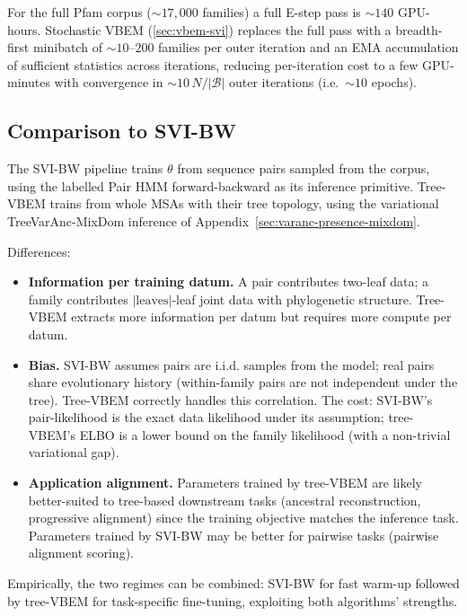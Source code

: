 For the full Pfam corpus ($\sim 17{,}000$ families) a full E-step pass
is $\sim 140$ GPU-hours. Stochastic VBEM
(\cref{sec:vbem-svi}) replaces the full pass with a breadth-first
minibatch of $\sim 10$--$200$ families per outer iteration and an EMA
accumulation of sufficient statistics across iterations,
reducing per-iteration cost to a few GPU-minutes with convergence in
$\sim 10\,N/|\mathcal{B}|$ outer iterations (i.e.\ $\sim 10$ epochs).

\subsection{Comparison to SVI-BW}
\label{sec:vbem-vs-svibw}

The SVI-BW pipeline trains $\theta$ from sequence pairs sampled from
the corpus, using the labelled Pair HMM forward-backward as its
inference primitive. Tree-VBEM trains from whole MSAs with their tree
topology, using the variational TreeVarAnc-MixDom inference of
Appendix~\ref{sec:varanc-presence-mixdom}.

Differences:
\begin{itemize}[nosep]
\item \textbf{Information per training datum.} A pair contributes
two-leaf data; a family contributes $|\text{leaves}|$-leaf joint data
with phylogenetic structure. Tree-VBEM extracts more information per
datum but requires more compute per datum.
\item \textbf{Bias.} SVI-BW assumes pairs are i.i.d. samples from the
model; real pairs share evolutionary history (within-family pairs are
not independent under the tree). Tree-VBEM correctly handles this
correlation. The cost: SVI-BW's pair-likelihood is the exact data
likelihood under its assumption; tree-VBEM's ELBO is a lower bound on
the family likelihood (with a non-trivial variational gap).
\item \textbf{Application alignment.} Parameters trained by tree-VBEM
are likely better-suited to tree-based downstream tasks (ancestral
reconstruction, progressive alignment) since the training objective
matches the inference task. Parameters trained by SVI-BW may be better
for pairwise tasks (pairwise alignment scoring).
\end{itemize}
Empirically, the two regimes can be combined: SVI-BW for fast warm-up
followed by tree-VBEM for task-specific fine-tuning, exploiting both
algorithms' strengths.
